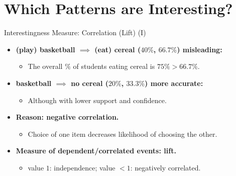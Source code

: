 \section{Which Patterns are Interesting?}

\begin{frame}{Interestingness Measure: Correlation (Lift) (I)}
	\begin{itemize}
		\item \textbf{(play) basketball $\implies$ (eat) cereal
			      ($40\%$, $66.7\%$)  misleading:}
		      \begin{itemize}
			      \item The overall $\%$ of students eating cereal is $75\% >
				            66.7\%$.
		      \end{itemize}
		\item \textbf{basketball $\implies$ no cereal ($20\%$,
			      $33.3\%$)  more accurate:}
		      \begin{itemize}
			      \item Although with lower support and confidence.
		      \end{itemize}
		\item \textbf{Reason: negative correlation.}
		      \begin{itemize}
			      \item Choice of one item decreases likelihood of choosing
			            the other.
		      \end{itemize}
		\item \textbf{Measure of dependent/correlated events: lift.}
		      \begin{itemize}
			      \item value $1$: independence; value $< 1$: negatively
			            correlated.
		      \end{itemize}
	\end{itemize}
\end{frame}


